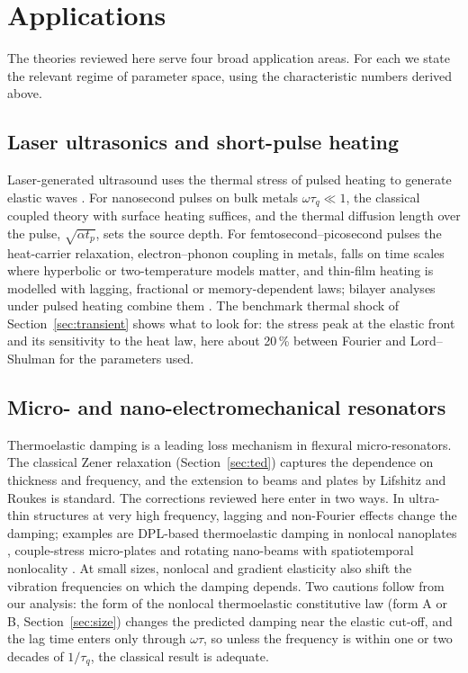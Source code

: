 \section{Applications}\label{sec:applications}
The theories reviewed here serve four broad application areas. For each we state the relevant regime of parameter space, using the characteristic numbers derived above.

\subsection{Laser ultrasonics and short-pulse heating}
Laser-generated ultrasound uses the thermal stress of pulsed heating to generate elastic waves \citep{Scruby1990}. For nanosecond pulses on bulk metals $\omega\tau_q\ll1$, the classical coupled theory with surface heating suffices, and the thermal diffusion length over the pulse, $\sqrt{\alpha t_p}$, sets the source depth. For femtosecond--picosecond pulses the heat-carrier relaxation, electron--phonon coupling in metals, falls on time scales where hyperbolic or two-temperature models matter, and thin-film heating is modelled with lagging, fractional or memory-dependent laws; bilayer analyses under pulsed heating combine them \citep{Li2019}. The benchmark thermal shock of Section~\ref{sec:transient} shows what to look for: the stress peak at the elastic front and its sensitivity to the heat law, here about 20\,\% between Fourier and Lord--Shulman for the parameters used.

\subsection{Micro- and nano-electromechanical resonators}
Thermoelastic damping is a leading loss mechanism in flexural micro-resonators. The classical Zener relaxation (Section~\ref{sec:ted}) captures the dependence on thickness and frequency, and the extension to beams and plates by Lifshitz and Roukes \citep{Lifshitz2000} is standard. The corrections reviewed here enter in two ways. In ultra-thin structures at very high frequency, lagging and non-Fourier effects change the damping; examples are DPL-based thermoelastic damping in nonlocal nanoplates \citep{Yang2021}, couple-stress micro-plates \citep{Kumar2017} and rotating nano-beams with spatiotemporal nonlocality \citep{Sur2025}. At small sizes, nonlocal and gradient elasticity also shift the vibration frequencies on which the damping depends. Two cautions follow from our analysis: the form of the nonlocal thermoelastic constitutive law (form A or B, Section~\ref{sec:size}) changes the predicted damping near the elastic cut-off, and the lag time enters only through $\omega\tau$, so unless the frequency is within one or two decades of $1/\tau_q$, the classical result is adequate.

